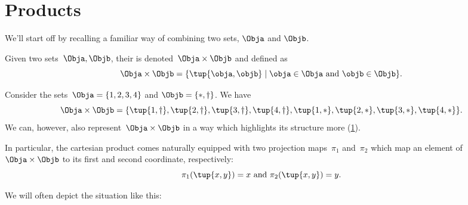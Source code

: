 

\section{Products}
\label{sec:combination-products}

We'll start off by recalling a familiar way of combining two sets, $\Obja$ and $\Objb$.


\begin{definition}
  \label{def:cartesian-product}
  Given two sets~$\Obja,\Objb$, their \emph{} is denoted~$\Obja \times  \Objb$ and defined as
  \begin{equation*}
    \Obja \times \Objb =\{ \tup{\obja,\objb}\mid \obja \in \Obja \text{ and } \objb \in \Objb\}.
  \end{equation*}
\end{definition}

\begin{example}
  Consider the sets~$\Obja = \{1, 2, 3, 4\}$ and $\Objb = \{ \ast, \dagger \}$.
  We have
  \begin{equation*}
    \Obja \times \Objb = \{ \tup{1, \dagger}, \tup{2, \dagger}, \tup{3, \dagger}, \tup{4, \dagger}, \tup{1, *}, \tup{2, *}, \tup{3, *}, \tup{4, *} \}.
  \end{equation*}
  We can, however, also represent~$\Obja \times \Objb$ in a way which highlights its structure more (\cref{fig:example_cartesian}).

  \begin{figure}[h!]
    \begin{center}
    \end{center}
    \caption{\label{fig:example_cartesian}}
  \end{figure}
  In particular, the cartesian product comes naturally equipped with two projection maps~$\pi_1$ and~$\pi_2$ which map an element of~$\Obja \times \Objb$ to its first and second coordinate, respectively:
  \begin{equation*}
    \pi_1(\tup{x,y}) =  x \text{ and } \pi_2(\tup{x,y}) = y.
  \end{equation*}

  We will often depict the situation like this:
  \begin{center}
  \end{center}
\end{example}

